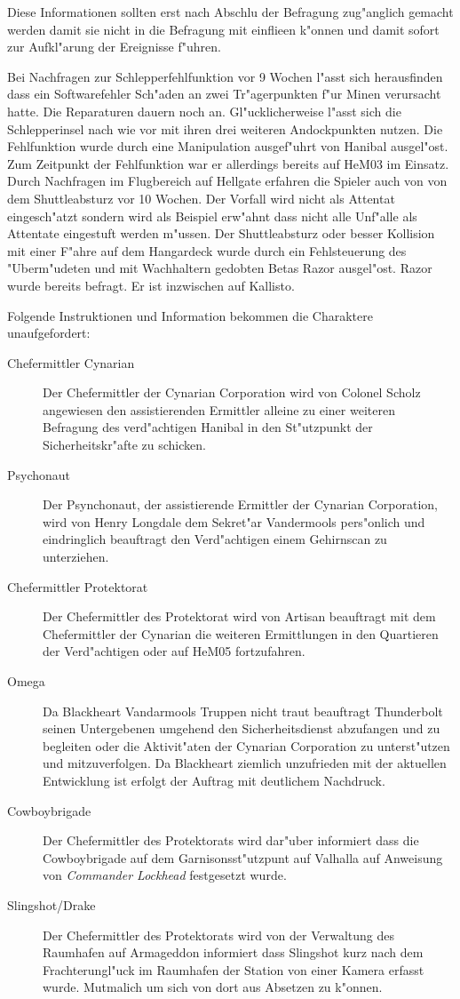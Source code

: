 Diese Informationen sollten erst nach Abschlu\3 der Befragung zug"anglich gemacht werden damit sie nicht in die Befragung mit einflie\3en k"onnen und damit sofort zur Aufkl"arung der Ereignisse f"uhren.

Bei Nachfragen zur Schlepperfehlfunktion vor 9 Wochen l"asst sich herausfinden dass ein Softwarefehler Sch"aden an zwei Tr"agerpunkten f"ur Minen verursacht hatte. Die Reparaturen dauern noch an. Gl"ucklicherweise l"asst sich die Schlepperinsel nach wie vor mit ihren drei weiteren Andockpunkten nutzen. Die Fehlfunktion wurde durch eine Manipulation ausgef"uhrt von Hanibal ausgel"ost. Zum Zeitpunkt der Fehlfunktion war er allerdings bereits auf HeM03 im Einsatz. Durch Nachfragen im Flugbereich auf Hellgate erfahren die Spieler auch von von dem Shuttleabsturz vor 10 Wochen. Der Vorfall wird nicht als Attentat eingesch"atzt sondern wird als Beispiel erw"ahnt dass nicht alle Unf"alle als Attentate eingestuft werden m"ussen. Der Shuttleabsturz oder besser Kollision mit einer F"ahre auf dem Hangardeck wurde durch ein Fehlsteuerung des "Uberm"udeten und mit Wachhaltern gedobten Betas Razor ausgel"ost. Razor wurde bereits befragt. Er ist inzwischen auf Kallisto.

Folgende Instruktionen und Information bekommen die Charaktere unaufgefordert:

\begin{description}
	\item[Chefermittler Cynarian] Der Chefermittler der Cynarian Corporation wird von Colonel Scholz angewiesen den assistierenden Ermittler alleine zu einer weiteren Befragung des verd"achtigen Hanibal in den St"utzpunkt der Sicherheitskr"afte zu schicken.
	\item[Psychonaut] Der Psynchonaut, der assistierende Ermittler der Cynarian Corporation, wird von Henry Longdale dem Sekret"ar Vandermools pers"onlich und eindringlich beauftragt den Verd"achtigen einem Gehirnscan zu unterziehen.
	\item[Chefermittler Protektorat] Der Chefermittler des Protektorat wird von Artisan beauftragt mit dem Chefermittler der Cynarian die weiteren Ermittlungen in den Quartieren der Verd"achtigen oder auf HeM05 fortzufahren.
	\item[Omega] Da Blackheart Vandarmools Truppen nicht traut beauftragt Thunderbolt seinen Untergebenen umgehend den Sicherheitsdienst abzufangen und zu begleiten oder die Aktivit"aten der Cynarian Corporation zu unterst"utzen und mitzuverfolgen. Da Blackheart ziemlich unzufrieden mit der aktuellen Entwicklung ist erfolgt der Auftrag mit deutlichem Nachdruck.	
	\item[Cowboybrigade] Der Chefermittler des Protektorats wird dar"uber informiert dass die Cowboybrigade auf dem Garnisonsst"utzpunt auf Valhalla auf Anweisung von \emph{Commander Lockhead} festgesetzt wurde.
	\item[Slingshot/Drake] Der Chefermittler des Protektorats wird von der Verwaltung des Raumhafen auf Armageddon informiert dass Slingshot kurz nach dem Frachterungl"uck im Raumhafen der Station von einer Kamera erfasst wurde. Mutma\3lich um sich von dort aus Absetzen zu k"onnen.
\end{description}
\vfill\pagebreak

